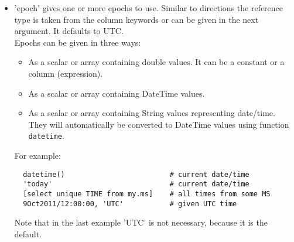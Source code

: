 \begin{itemize}
\item 'epoch' gives one or more epochs to use. Similar to
  directions the reference type is taken from the column keywords or
  can be given in the next argument. It defaults to UTC.
\\Epochs can be given in three ways:
  \begin{itemize}
    \item As a scalar or array containing double values. It can be a constant or a
      column (expression).
    \item As a scalar or array containing DateTime values.
    \item As a scalar or array containing String values representing
      date/time. They will automatically be converted to DateTime
      values using function \texttt{datetime}. 
  \end{itemize}
  For example:
\begin{verbatim}
  datetime()                         # current date/time
  'today'                            # current date/time
  [select unique TIME from my.ms]    # all times from some MS
  9Oct2011/12:00:00, 'UTC'           # given UTC time
\end{verbatim}
Note that in the last example 'UTC' is not necessary, because it is
the default.


\end{itemize}
